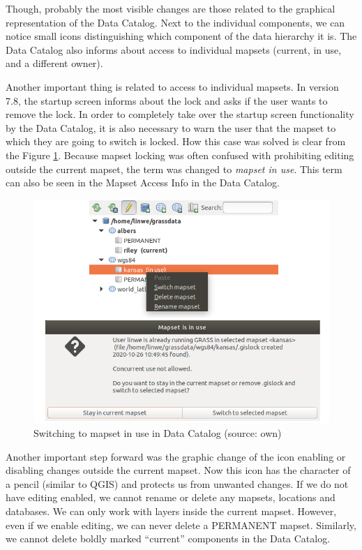 \documentclass[a4paper,10pt,twoside]{article}
\begin{document}
\newpage Though, probably the most visible changes are those related to the graphical representation of the Data Catalog. Next to the individual components, we can notice small icons distinguishing which component of the data hierarchy it is. The Data Catalog also informs about access to individual mapsets (current, in use, and a different owner).

Another important thing is related to access to individual mapsets. In version 7.8, the startup screen informs about the lock and asks if the user wants to remove the lock.
In order to completely take over the startup screen functionality by the Data Catalog, it is also necessary to warn the user that the mapset to which they are going to switch is locked. How this case was solved is clear from the Figure \ref{fig:data_catalog_switch_new}. Because mapset locking was often confused with prohibiting editing outside the current mapset, the term was changed to \textit{mapset in use}. This term can also be seen in the Mapset Access Info in the Data Catalog.

\vspace{0.3cm}
\begin{figure}[hbt!] 
\begin{center}
\includegraphics[width=13cm]{../pictures/data_catalog_switch.png} 
\caption[Switching to mapset in use in Data Catalog]{Switching to mapset in use in Data Catalog (source: own)}
\label{fig:data_catalog_switch_new}
\end{center}
\end{figure}

\noindent Another important step forward was the graphic change of the icon enabling or disabling changes outside the current mapset. Now this icon has the character of a pencil (similar to QGIS) and protects us from unwanted changes. If we do not have editing enabled, we cannot rename or delete any mapsets, locations and databases. We can only work with layers inside the current mapset. However, even if we enable editing, we can never delete a PERMANENT mapset. Similarly, we cannot delete boldly marked ``current” components in the Data Catalog.
\end{document}
